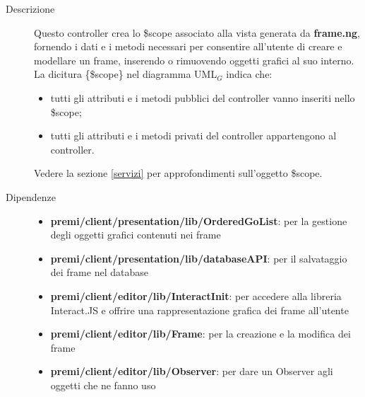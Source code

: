 \begin{description}
\item[Descrizione] \hfill
	Questo controller crea lo \$scope associato alla vista generata da \textbf{frame.ng}, fornendo i dati e i metodi necessari per consentire all'utente di creare e modellare un frame, inserendo o rimuovendo oggetti grafici al suo interno.
\\ La dicitura \{\$scope\} nel diagramma UML$_G$ indica che:
\begin{itemize}
\item tutti gli attributi e i metodi pubblici del controller vanno inseriti nello \$scope;
\item tutti gli attributi e i metodi privati del controller appartengono al controller.
\end{itemize}
Vedere la sezione \ref{servizi} per approfondimenti sull'oggetto \$scope.
	
	
\item[Dipendenze] \hfill
	\begin{itemize}
		\item \textbf{premi/client/presentation/lib/OrderedGoList}: per la gestione degli oggetti grafici contenuti nei frame
		\item \textbf{premi/client/presentation/lib/databaseAPI}: per il salvataggio dei frame nel database
		\item \textbf{premi/client/editor/lib/InteractInit}: per accedere alla libreria Interact.JS e offrire una rappresentazione grafica dei frame all'utente
		\item \textbf{premi/client/editor/lib/Frame}: per la creazione e la modifica dei frame
		\item \textbf{premi/client/editor/lib/Observer}: per dare un Observer agli oggetti che ne fanno uso
	\end{itemize}
	

\end{description}
